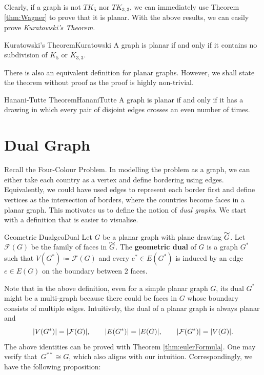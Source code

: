 \documentclass[math]{amznotes}
\renewcommand\widetilde[1]{\ThisStyle{%
  \setbox0=\hbox{$\SavedStyle#1$}%
  \stackengine{1pt-\LMpt}{$\SavedStyle#1$}{%
    \stretchto{\scaleto{\SavedStyle\mkern.2mu\sim}{.5467\wd0}}{.5\ht0}%
  }{O}{c}{F}{T}{S}%
}}
\theoremstyle{remark}
\newcommand{\0}{\mathbf{0}}
\newcommand{\1}{\mathbf{1}}
\begin{document}
Clearly, if a graph is not $TK_5$ nor $TK_{3, 3}$, we can immediately use Theorem \ref{thm:Wagner} to prove that it is planar. With the above results, we can easily prove \textit{Kuratowski's Theorem}.
\begin{thmbox}{Kuratowski's Theorem}{Kuratowski}
    A graph is planar if and only if it contains no subdivision of $K_5$ or $K_{3, 3}$.
\end{thmbox}
There is also an equivalent definition for planar graphs. However, we shall state the theorem without proof as the proof is highly non-trivial.
\begin{thmbox}{Hanani-Tutte Theorem}{HananiTutte}
    A graph is planar if and only if it has a drawing in which every pair of disjoint edges crosses an even number of times.
\end{thmbox}
\section{Dual Graph}
Recall the Four-Colour Problem. In modelling the problem as a graph, we can either take each country as a vertex and define bordering using edges. Equivalently, we could have used edges to represent each border first and define vertices as the intersection of borders, where the countries become faces in a planar graph. This motivates us to define the notion of \textit{dual graphs}. We start with a definition that is easier to visualise.
\begin{dfnbox}{Geometric Dual}{geoDual}
    Let $G$ be a planar graph with plane drawing $\widetilde{G}$. Let $\mathcal{F}(G)$ be the family of faces in $\widetilde{G}$. The {\color{red} \textbf{geometric dual}} of $G$ is a graph $G^*$ such that $V(G^*) \coloneqq \mathcal{F}(G)$ and every $e^* \in E(G^*)$ is induced by an edge $e \in E(G)$ on the boundary between $2$ faces.
\end{dfnbox}
Note that in the above definition, even for a simple planar graph $G$, its dual $G^*$ might be a multi-graph because there could be faces in $G$ whose boundary consists of multiple edges. Intuitively, the dual of a planar graph is always planar and 
\begin{equation*}
    {\left\lvert {V(G^*)} \right\rvert} = {\left\lvert {\mathcal{F}(G)} \right\rvert}, \qquad {\left\lvert {E(G^*)} \right\rvert} = {\left\lvert {E(G)} \right\rvert}, \qquad {\left\lvert {\mathcal{F}(G^*)} \right\rvert} = {\left\lvert {V(G)} \right\rvert}.
\end{equation*}
The above identities can be proved with Theorem \ref{thm:eulerFormula}. One may verify that~$G^{**} \cong G$, which also aligns with our intuition. Correspondingly, we have the following proposition:
\end{document}

